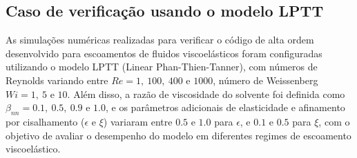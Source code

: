 \subsection{Caso de verificação usando o modelo LPTT}

As simulações numéricas realizadas para verificar o código de alta ordem desenvolvido para escoamentos de fluidos viscoelásticos foram configuradas utilizando o modelo LPTT (Linear Phan-Thien-Tanner), com números de Reynolds variando entre $Re = 1,\ 100,\ 400$ e $1000$, número de Weissenberg $Wi = 1,\ 5$ e $10$. Além disso, a razão de viscosidade do solvente foi definida como $\beta_{nn} = 0.1,\ 0.5,\ 0.9$ e $1.0$, e os parâmetros adicionais de elasticidade e afinamento por cisalhamento ($\epsilon$ e $\xi$) variaram entre $0.5$ e $1.0$ para $\epsilon$, e $0.1$ e $0.5$ para $\xi$, com o objetivo de avaliar o desempenho do modelo em diferentes regimes de escoamento viscoelástico.

